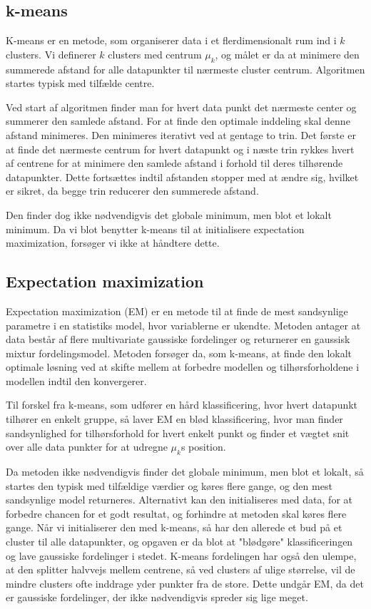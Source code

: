 

\subsection{k-means}

K-means er en metode, som organiserer data i et flerdimensionalt rum ind i $k$
clusters. Vi definerer $k$ clusters med centrum $\mu_k$, og målet er da at
minimere den summerede afstand for alle datapunkter til nærmeste cluster
centrum. Algoritmen startes typisk med tilfælde centre.

Ved start af algoritmen finder man for hvert data punkt det nærmeste center
og summerer den samlede afstand. For at finde den optimale inddeling skal
denne afstand minimeres. Den minimeres iterativt ved at gentage to trin. Det
første er at finde det nærmeste centrum for hvert datapunkt og i næste trin
rykkes hvert af centrene for at minimere den samlede afstand i forhold til
deres tilhørende datapunkter. Dette fortsættes indtil afstanden stopper med
at ændre sig, hvilket er sikret, da begge trin reducerer den summerede
afstand. 

Den finder dog ikke nødvendigvis det globale minimum, men blot et
lokalt minimum. Da vi blot benytter k-means til at initialisere expectation
maximization, forsøger vi ikke at håndtere dette.

\subsection{Expectation maximization}

Expectation maximization (EM) er en metode til at finde de mest sandsynlige
parametre i en statistiks model, hvor variablerne er ukendte. Metoden antager
at data består af flere multivariate gaussiske fordelinger og returnerer en
gaussisk mixtur fordelingsmodel. Metoden forsøger
da, som k-means, at finde den lokalt optimale løsning ved at skifte mellem at
forbedre modellen og tilhørsforholdene i modellen indtil den konvergerer.

Til forskel fra k-means, som udfører en hård klassificering, hvor hvert
datapunkt tilhører en enkelt gruppe, så laver EM en blød klassificering, hvor
man finder sandsynlighed for tilhørsforhold for hvert enkelt punkt og finder et
vægtet snit over alle data punkter for at udregne $\mu_k$s position.

Da metoden ikke nødvendigvis finder det globale minimum, men blot et lokalt,
så startes den typisk med tilfældige værdier og køres flere gange, og
den mest sandsynlige model returneres. Alternativt kan den initialiseres med
data, for at forbedre chancen for et godt resultat, og forhindre at metoden
skal køres flere gange. Når vi initialiserer den med k-means, så har den
allerede et bud på et cluster til alle datapunkter, og opgaven er da blot
at "blødgøre" klassificeringen og lave gaussiske fordelinger i stedet. K-means
fordelingen har også den ulempe, at den splitter halvvejs mellem centrene, så
ved clusters af ulige størrelse, vil de mindre clusters ofte inddrage yder
punkter fra de store. Dette undgår EM, da det er gaussiske fordelinger, der
ikke nødvendigvis spreder sig lige meget.


